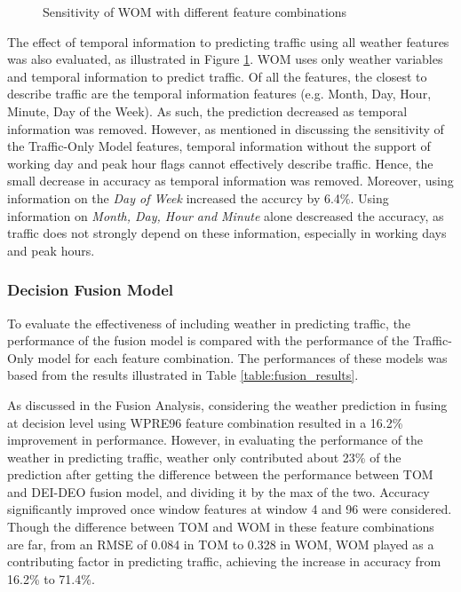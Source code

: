 \begin{figure}[h]
  \centering
  \captionsetup{justification=centering}
  \caption{Sensitivity of WOM with different feature combinations}
  \label{fig:WOM_sensitivity}
\end{figure}

The effect of temporal information to predicting traffic using all weather features was also evaluated, as illustrated in Figure \ref{fig:WOM_sensitivity}. WOM uses only weather variables and temporal information to predict traffic. Of all the features, the closest to describe traffic are the temporal information features (e.g. Month, Day, Hour, Minute, Day of the Week). As such, the prediction decreased as temporal information was removed. However, as mentioned in discussing the sensitivity of the Traffic-Only Model features, temporal information without the support of working day and peak hour flags cannot effectively describe traffic. Hence, the small decrease in accuracy as temporal information was removed. Moreover, using information on the \textit{Day of Week} increased the accurcy by 6.4\%. Using information on \textit{Month, Day, Hour and Minute} alone descreased the accuracy, as traffic does not strongly depend on these information, especially in working days and peak hours. 


\subsubsection{Decision Fusion Model}
To evaluate the effectiveness of including weather in predicting traffic, the performance of the fusion model is compared with the performance of the Traffic-Only model for each feature combination. The performances of these models was based from the results illustrated in Table \ref{table:fusion_results}. 

As discussed in the Fusion Analysis, considering the weather prediction in fusing at decision level using WPRE96 feature combination resulted in a 16.2\% improvement in performance. However, in evaluating the performance of the weather in predicting traffic, weather only contributed about 23\% of the prediction after getting the difference between the performance between TOM and DEI-DEO fusion model, and dividing it by the max of the two. Accuracy significantly improved once window features at window 4 and 96 were considered. Though the difference between TOM and WOM in these feature combinations are far, from an RMSE of 0.084 in TOM to 0.328 in WOM, WOM played as a contributing factor in predicting traffic, achieving the increase in accuracy from 16.2\% to 71.4\%. 

